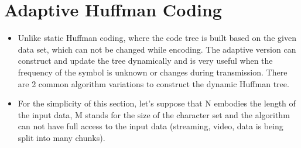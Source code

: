 \section{Adaptive Huffman Coding}
\begin{itemize}
    \item Unlike static Huffman coding, where the code tree is built based on the given data set, which can not be changed while encoding. The adaptive version can construct and update the tree dynamically and is very useful when the frequency of the symbol is unknown or changes during transmission. There are 2 common algorithm variations to construct the dynamic Huffman tree.
    \item For the simplicity of this section, let's suppose that N embodies the length of the input data, M stands for the size of the character set and the algorithm can not have full access to the input data (streaming, video, data is being split into many chunks).
\end{itemize}
